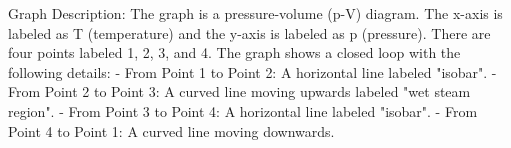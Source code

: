 Graph Description: The graph is a pressure-volume (p-V) diagram. The x-axis is labeled as T (temperature) and the y-axis is labeled as p (pressure). There are four points labeled 1, 2, 3, and 4. The graph shows a closed loop with the following details:
- From Point 1 to Point 2: A horizontal line labeled "isobar".
- From Point 2 to Point 3: A curved line moving upwards labeled "wet steam region".
- From Point 3 to Point 4: A horizontal line labeled "isobar".
- From Point 4 to Point 1: A curved line moving downwards.